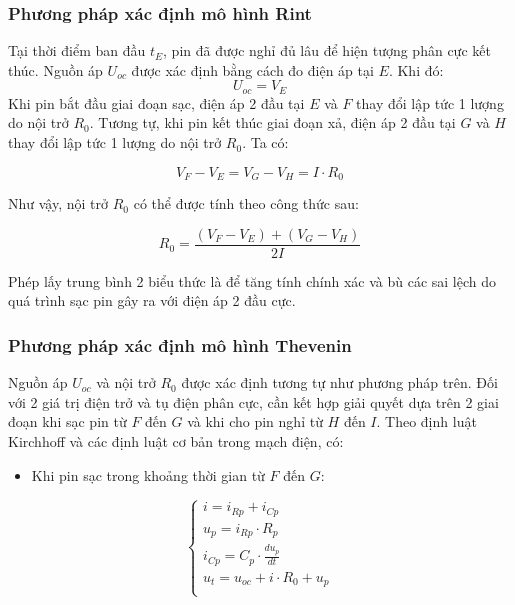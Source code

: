 \documentclass{thesis}
\begin{document}
    \subsubsection{Phương pháp xác định mô hình Rint}
    Tại thời điểm ban đầu $t_E$, pin đã được nghỉ đủ lâu để hiện tượng phân cực kết thúc. Nguồn áp $U_{oc}$ được xác định bằng cách đo điện áp tại $E$. Khi đó:
\begin{equation}
U_{oc} = V_E 
\end{equation}
    Khi pin bắt đầu giai đoạn sạc, điện áp 2 đầu tại $E$ và $F$ thay đổi lập tức 1 lượng do nội trở $R_0$. Tương tự, khi pin kết thúc giai đoạn xả, điện áp 2 đầu tại $G$ và $H$ thay đổi lập tức 1 lượng do nội trở $R_0$. Ta có:

    \begin{equation}
V_F - V_E = V_G - V_H = I \cdot R_0 
\end{equation}

    Như vậy, nội trở $R_0$ có thể được tính theo công thức sau:

    \begin{equation}
R_0 = \frac{(V_F - V_E) + (V_G - V_H)}{2I} 
\end{equation}

    Phép lấy trung bình 2 biểu thức là để tăng tính chính xác và bù các sai lệch do quá trình sạc pin gây ra với điện áp 2 đầu cực.

    \subsubsection{Phương pháp xác định mô hình Thevenin}
    Nguồn áp $U_{oc}$ và nội trở $R_0$ được xác định tương tự như phương pháp trên. Đối với 2 giá trị điện trở và tụ điện phân cực, cần kết hợp giải quyết dựa trên 2 giai đoạn khi sạc pin từ $F$ đến $G$ và khi cho pin nghỉ từ $H$ đến $I$. Theo định luật Kirchhoff và các định luật cơ bản trong mạch điện, có:

    \begin{itemize}
        \item Khi pin sạc trong khoảng thời gian từ $F$ đến $G$:
    \end{itemize}

    \begin{equation}
\begin{cases}
i = i_{Rp} + i_{Cp} \\
u_p = i_{Rp} \cdot R_p\\
i_{Cp} = C_p \cdot \frac{du_p}{dt}\\
u_t = u_{oc} + i \cdot R_0 + u_p  \\ 
\end{cases}
\end{equation}
\end{document}
